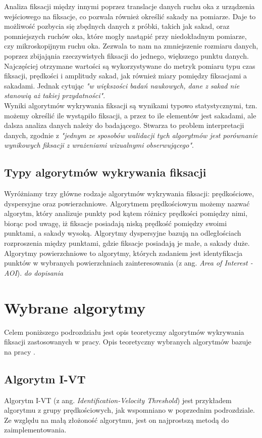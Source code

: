 Analiza fiksacji między innymi poprzez translacje danych ruchu oka z urządzenia wejściowego na fiksacje, co pozwala również określić sakady na pomiarze. Daje to możliwość pozbycia się zbędnych danych z próbki, takich jak sakad, oraz pomniejszych ruchów oka, które mogły nastąpić przy niedokładnym pomiarze, czy mikroskopijnym ruchu oka. Zezwala to nam na zmniejszenie rozmiaru danych, poprzez zbijająnia rzeczywistych fiksacji do jednego, większego punktu danych. Najczęściej otrzymane wartości są wykorzystywane do metryk pomiaru typu czas fiksacji, prędkości i amplitudy sakad, jak również miary pomiędzy fiksacjami a sakadami. Jednak cytując \cite{Main} \emph{"w większości badań naukowych, dane z sakad nie stanowią aż takiej przydatności"}.\\[\baselineskip]
Wyniki algorytmów wykrywania fiksacji są wynikami typowo statystycznymi, tzn. możemy określić ile wystąpiło fiksacji, a przez to ile elementów jest sakadami, ale dalsza analiza danych należy do badającego. Stwarza to problem interpretacji danych, zgodnie z \cite{Main} \emph{"jednym ze sposobów walidacji tych algorytmów jest porównanie wynikowych fiksacji z wrażeniami wizualnymi obserwującego"}.
\subsection{Typy algorytmów wykrywania fiksacji}
Wyróżniamy trzy główne rodzaje algorytmów wykrywania fiksacji: prędkościowe, dyspersyjne oraz powierzchniowe. Algorytmem prędkościowym możemy nazwać algorytm, który analizuje punkty pod kątem różnicy prędkości pomiędzy nimi, biorąc pod uwagę, iż fiksacje posiadają niską prędkość pomiędzy swoimi punktami, a sakady wysoką. Algorytmy dyspersyjne bazują na odległościach rozproszenia między punktami, gdzie fiksacje posiadają je małe, a sakady duże. Algorytmy powierzchniowe to algorytmy, których zadaniem jest identyfikacja punktów w wybranych powierzchniach zainteresowania (z ang. \textit{Area of Interest - AOI}). \emph{do dopisania}
\section{Wybrane algorytmy}
Celem poniższego podrozdziału jest opis teoretyczny algorytmów wykrywania fiksacji zastosowanych w pracy. Opis teoretyczny wybranych algorytmów bazuje na pracy \cite{Main}.
\subsection{Algorytm I-VT}
Algorytm I-VT (z ang. \emph{Identification-Velocity Threshold}) jest przykładem algorytmu z grupy prędkościowych, jak wspomniano w poprzednim podrozdziale. Ze względu na małą złożoność algorytmu, jest on najprostszą metodą do zaimplementowania.\\

